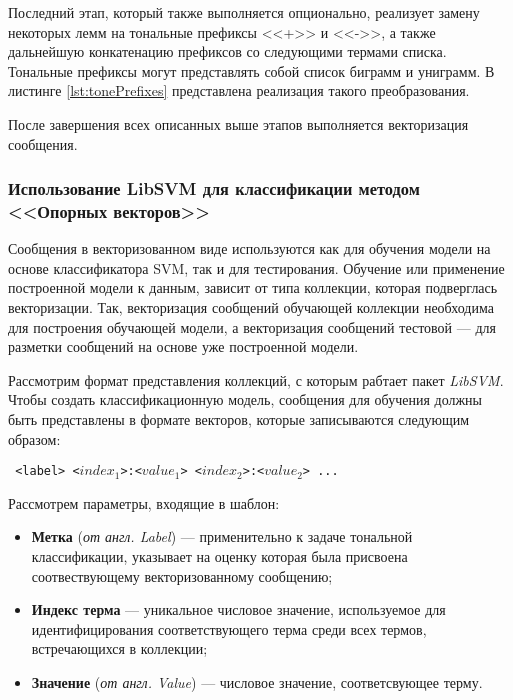     Последний этап, который также выполняется опционально, реализует замену
    некоторых лемм на тональные префиксы <<+>> и <<->>, а также дальнейшую
    конкатенацию префиксов со следующими термами списка. Тональные префиксы
    могут представлять собой список биграмм и униграмм. В листинге
    \ref{lst:tonePrefixes} представлена реализация такого преобразования.

    \lstset{style=python}
    


    После завершения всех описанных выше этапов выполняется векторизация
    сообщения.

    \subsubsection{Использование LibSVM для классификации методом <<Опорных векторов>>}

    Сообщения в векторизованном виде используются как для обучения
    модели на основе классификатора SVM, так и для тестирования.
    Обучение или применение построенной модели к данным, зависит от типа коллекции,
    которая подверглась векторизации.
    Так, векторизация сообщений обучающей коллекции необходима для построения
    обучающей модели, а векторизация сообщений тестовой --- для разметки сообщений
    на основе уже построенной модели.

    Рассмотрим формат представления коллекций, с которым рабтает пакет {\it LibSVM}.
    Чтобы создать классификационную модель, сообщения для обучения должны быть
    представлены в формате векторов, которые записываются следующим образом:
    \begin{center}
        \tt
        <label> <$index_1$>:<$value_1$> <$index_2$>:<$value_2$> ...
    \end{center}

    Рассмотрем параметры, входящие в шаблон:
    \begin{itemize}
        \item {\bf Метка} ({\it от англ. Label}) --- применительно к задаче
        тональной классификации, указывает на оценку которая была присвоена
        соотвествующему векторизованному сообщению;
        \item {\bf Индекс терма} --- уникальное числовое значение, используемое
        для идентифицирования соответствующего терма среди всех термов, встречающихся
        в коллекции;
        \item {\bf Значение} ({\it от англ. Value}) --- числовое значение,
        соответсвующее терму.
    \end{itemize}

